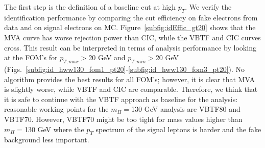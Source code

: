 The first step is the definition of a baseline cut at high $p_T$. 
We verify the identification performance by comparing the cut efficiency on fake electrons from data and on signal electrons on MC.
Figure~\ref{subfig:idEffic_gt20} shows that the MVA curve has worse rejection power than CIC, while the VBTF and CIC curves cross.
This result can be interpreted in terms of analysis performance by looking at the FOM's for $p_{T,max}>$20 GeV and $p_{T,min}>$20 GeV
(Figs.~\ref{subfig:id_hww130_fom1_pt20}-\ref{subfig:id_hww130_fom3_pt20}). 
No algorithm provides the best results for all FOM's; however, it is clear that MVA is slightly worse, while VBTF and CIC are comparable.
Therefore, we think that it is safe to continue with the VBTF approach as baseline for the analysis:
reasonable working points for the $m_H=$130 GeV analysis are VBTF80 and VBTF70. 
However, VBTF70 might be too tight for mass values higher than $m_H=$130 GeV where the $p_T$ spectrum of the signal leptons 
is harder and the fake background less important.
 
